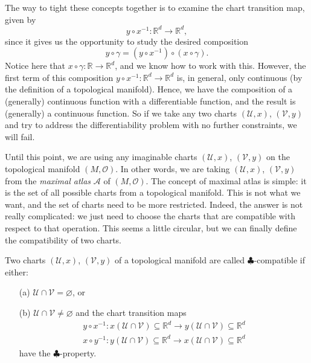 The way to tight these concepts together is to examine the chart transition map, given by
\[
    y \circ x^{-1}:\mathbb{R}^d \longrightarrow \mathbb{R}^d,
\]
since it gives us the opportunity to study the desired composition
\[
    y \circ \gamma = (y \circ x^{-1}) \circ (x \circ \gamma).
\]
Notice here that $x \circ \gamma : \mathbb{R} \longrightarrow \mathbb{R}^d$, and we know how to work with this. However, the first term of this composition $y \circ x^{-1}: \mathbb{R}^d \longrightarrow \mathbb{R}^d$ is, in general, only continuous (by the definition of a topological manifold). Hence, we have the composition of a (generally) continuous function with a differentiable function, and the result is (generally) a continuous function. So if we take any two charts $(\mathcal{U}, x)$, $(\mathcal{V}, y)$ and try to address the differentiability problem with no further constraints, we will fail. 

Until this point, we are using any imaginable charts $(\mathcal{U},x)$, $(\mathcal{V},y)$ on the topological manifold $(M, \mathcal{O})$. In other words, we are taking $(\mathcal{U},x)$, $(\mathcal{V},y)$ from the \emph{maximal atlas} $\mathcal{A}$ of $(M, \mathcal{O})$. The concept of maximal atlas is simple: it is the set of all possible charts from a topological manifold. This is not what we want, and the set of charts need to be more restricted. Indeed, the answer is not really complicated: we just need to choose the charts that are compatible with respect to that operation. This seems a little circular, but we can finally define the compatibility of two charts.

\begin{definition}
    Two charts $(\mathcal{U},x)$, $(\mathcal{V},y)$ of a topological manifold are called $\clubsuit$-compatible if either:
    \begin{itemize}
        \item[(a)] $\mathcal{U} \cap \mathcal{V} = \varnothing$, or
        \item[(b)] $\mathcal{U} \cap \mathcal{V} \neq \varnothing$ and the chart transition maps
        \begin{align*}
            y \circ x^{-1} : x(\mathcal{U} \cap \mathcal{V}) \subseteq \mathbb{R}^d \longrightarrow y(\mathcal{U} \cap \mathcal{V}) \subseteq \mathbb{R}^d  \\
            x \circ y^{-1} : y(\mathcal{U} \cap \mathcal{V}) \subseteq \mathbb{R}^d \longrightarrow x(\mathcal{U} \cap \mathcal{V}) \subseteq \mathbb{R}^d 
        \end{align*}
        have the $\clubsuit$-property.
    \end{itemize}
\end{definition}


